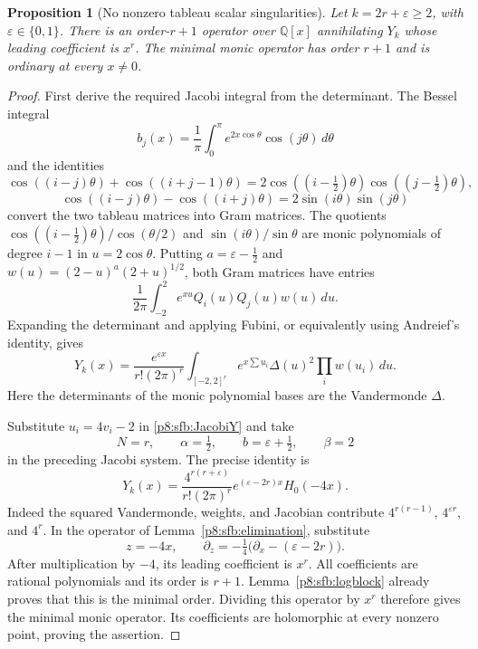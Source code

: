 \documentclass[11pt,a4paper]{article}
\newtheorem{proposition}[theorem]{Proposition}
\theoremstyle{definition}
\theoremstyle{remark}
\numberwithin{equation}{section}
\begin{document}
\begin{proposition}[No nonzero tableau scalar singularities]
\label{p8:sfb:tableauordinary}
Let $k=2r+\varepsilon\ge2$, with $\varepsilon\in\{0,1\}$.
There is an order-$r+1$ operator over $\mathbb Q[x]$
annihilating $Y_k$ whose leading coefficient is $x^r$.
The minimal monic operator has order $r+1$ and is ordinary
at every $x\ne0$.
\end{proposition}
\begin{proof}
First derive the required Jacobi integral from the determinant.
The Bessel integral
\[
 b_j(x)=\frac1\pi\int_0^\pi e^{2x\cos\theta}
                          \cos(j\theta)\,d\theta
\]
and the identities
\[
 \cos((i-j)\theta)+\cos((i+j-1)\theta)
 =2\cos((i-\tfrac12)\theta)\cos((j-\tfrac12)\theta),
\]
\[
 \cos((i-j)\theta)-\cos((i+j)\theta)
 =2\sin(i\theta)\sin(j\theta)
\]
convert the two tableau matrices into Gram matrices.  The
quotients $\cos((i-\tfrac12)\theta)/\cos(\theta/2)$ and
$\sin(i\theta)/\sin\theta$ are monic polynomials of degree
$i-1$ in $u=2\cos\theta$.
Putting $a=\varepsilon-\tfrac12$ and
$w(u)=(2-u)^a(2+u)^{1/2}$, both Gram matrices have entries
\[
 \frac1{2\pi}\int_{-2}^2 e^{xu}Q_i(u)Q_j(u)w(u)\,du.
\]
Expanding the determinant and applying Fubini, or equivalently
using Andreief's identity, gives
\begin{equation}\label{p8:sfb:JacobiY}
 Y_k(x)=\frac{e^{\varepsilon x}}{r!(2\pi)^r}
 \int_{[-2,2]^r}e^{x\sum u_i}\Delta(u)^2
                         \prod_iw(u_i)\,du.
\end{equation}
Here the determinants of the monic polynomial bases are the
Vandermonde $\Delta$.

Substitute $u_i=4v_i-2$ in \eqref{p8:sfb:JacobiY} and take
\[
 N=r,\qquad \alpha=\tfrac12,\qquad
 b=\varepsilon+\tfrac12,\qquad \beta=2
\]
in the preceding Jacobi system.  The precise identity is
\[
 Y_k(x)=\frac{4^{r(r+\varepsilon)}}{r!(2\pi)^r}
       e^{(\varepsilon-2r)x}H_0(-4x).
\]
Indeed the squared Vandermonde, weights, and Jacobian contribute
$4^{r(r-1)}$, $4^{\varepsilon r}$, and $4^r$.
In the operator of Lemma~\ref{p8:sfb:elimination}, substitute
\[
 z=-4x,\qquad
 \partial_z=-\tfrac14\bigl(\partial_x-(\varepsilon-2r)\bigr).
\]
After multiplication by $-4$, its leading coefficient is $x^r$.
All coefficients are rational polynomials and its order is $r+1$.
Lemma~\ref{p8:sfb:logblock} already proves that this is the minimal
order.  Dividing this operator by $x^r$ therefore gives the
minimal monic operator.  Its coefficients are holomorphic at
every nonzero point, proving the assertion.
\end{proof}
\end{document}
